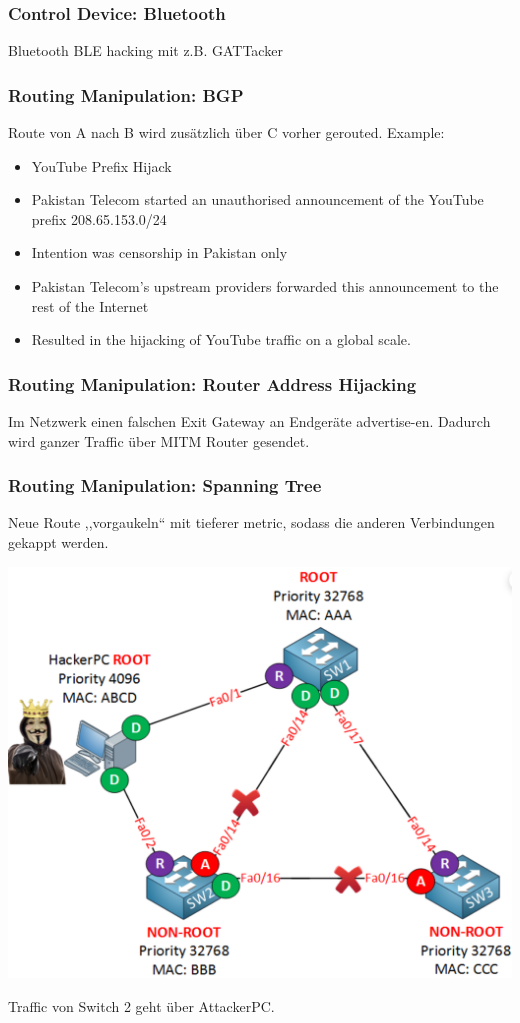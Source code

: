 \subsubsection{Control Device: Bluetooth}
Bluetooth BLE hacking mit z.B. GATTacker

\subsubsection{Routing Manipulation: BGP}
Route von A nach B wird zusätzlich über C vorher gerouted. Example:
\begin{itemize}
    \item YouTube Prefix Hijack
    \item Pakistan Telecom started an unauthorised announcement of the YouTube prefix 208.65.153.0/24
    \item Intention was censorship in Pakistan only
    \item Pakistan Telecom's upstream providers forwarded this announcement to the rest of the Internet
    \item Resulted in the hijacking of YouTube traffic on a global scale.
\end{itemize}

\subsubsection{Routing Manipulation: Router Address Hijacking}
Im Netzwerk einen falschen Exit Gateway an Endgeräte advertise-en. Dadurch wird ganzer Traffic über MITM Router gesendet.

\subsubsection{Routing Manipulation: Spanning Tree}
Neue Route ,,vorgaukeln`` mit tieferer metric, sodass die anderen Verbindungen gekappt werden.
\begin{center}
    \vspace{-8pt}
    \includegraphics[width=.6\linewidth]{./img/09-mitm/spanning_tree}
    \vspace{-8pt}
\end{center}
Traffic von Switch 2 geht über AttackerPC.
